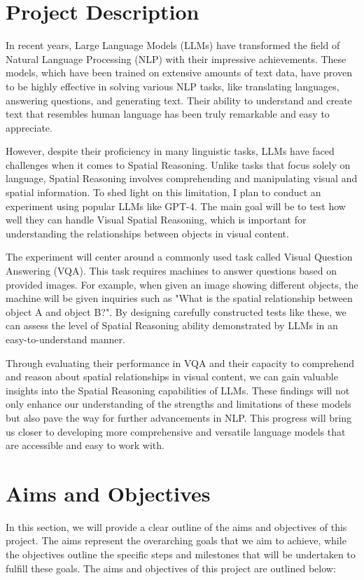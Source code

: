 \documentclass[journal,10pt]{IEEEtran}
\begin{document}

\section{Project Description}

In recent years, Large Language Models (LLMs) have transformed the field of Natural Language Processing (NLP) with their impressive achievements. These models, which have been trained on extensive amounts of text data, have proven to be highly effective in solving various NLP tasks, like translating languages, answering questions, and generating text. Their ability to understand and create text that resembles human language has been truly remarkable and easy to appreciate.

However, despite their proficiency in many linguistic tasks, LLMs have faced challenges when it comes to Spatial Reasoning. Unlike tasks that focus solely on language, Spatial Reasoning involves comprehending and manipulating visual and spatial information. To shed light on this limitation, I plan to conduct an experiment using popular LLMs like GPT-4\cite{peng2023instruction}. The main goal will be to test how well they can handle Visual Spatial Reasoning, which is important for understanding the relationships between objects in visual content.

The experiment will center around a commonly used task called Visual Question Answering (VQA). This task requires machines to answer questions based on provided images. For example, when given an image showing different objects, the machine will be given inquiries such as "What is the spatial relationship between object A and object B?". By designing carefully constructed tests like these, we can assess the level of Spatial Reasoning ability demonstrated by LLMs in an easy-to-understand manner.

Through evaluating their performance in VQA and their capacity to comprehend and reason about spatial relationships in visual content, we can gain valuable insights into the Spatial Reasoning capabilities of LLMs. These findings will not only enhance our understanding of the strengths and limitations of these models but also pave the way for further advancements in NLP. This progress will bring us closer to developing more comprehensive and versatile language models that are accessible and easy to work with.

\section{Aims and Objectives}
In this section, we will provide a clear outline of the aims and objectives of this project. The aims represent the overarching goals that we aim to achieve, while the objectives outline the specific steps and milestones that will be undertaken to fulfill these goals. The aims and objectives of this project are outlined below:
\end{document}
